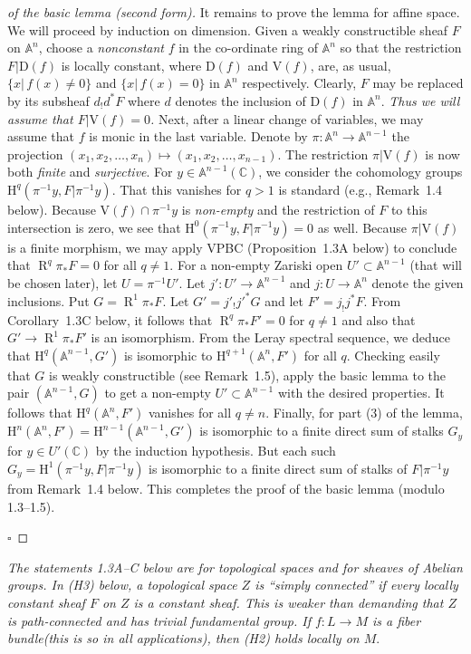 \documentclass[10pt,twoside]{article}
\newcommand{\homology}{{\mathrm {H}}}
\newcommand{\C}{{\mathbb {C}}}
\newcommand{\V}{{\mathrm {V}}}
\newcommand{\A}{{\mathbb {A}}}
\newcommand{\derived}{{\operatorname{R}}}
\newcommand{\qed}{\nopagebreak\par\hspace*{\fill}$\square$\par\vskip2mm}
\newtheorem{proof}{Proof}
\begin{document}
\begin{proof}[of the basic lemma (second form)]
  It remains to prove the lemma for affine space.
We will proceed
by induction on dimension. Given a weakly constructible sheaf $F$
on $\A^n$, choose a \emph{nonconstant} $f$ in the co-ordinate
ring of $\A^n$ so that the restriction $F|\mathrm{D}(f)$ is
locally constant, where $\mathrm{D}(f)$ and $\V(f)$, are, as usual,
$\{ x|\,f(x)\neq 0\}$ and $\{x|\,f(x)=0\}$ in $\A^n$
respectively. 
Clearly, $F$ may be replaced by its subsheaf $d_!d^*F$ where
$d$ denotes the inclusion of $\mathrm{D}(f)$ in $\A^n$.
\emph{Thus we will assume that $F|\V(f)=0$.} 
Next,
after a linear change of variables, we may assume that $f$
is monic in the last variable. 
Denote by $\pi : \A^n \to
\A^{n-1}$ the projection $(x_1,x_2,\ldots ,x_n)\mapsto 
(x_1,x_2,\ldots, x_{n-1})$. The restriction $\pi |\V(f)$ is now
both \emph{finite} and \emph{surjective}. For $y\in \A^{n-1}(\C)$,
we consider the cohomology groups $\homology ^q
(\pi^{-1}y,F|\pi^{-1}y)$. That this vanishes for $q>1$  
is standard (e.g., Remark~1.4 below). 
Because $\V(f)\cap \pi^{-1}y$ is \emph{non-empty} and the restriction of
$F$ to this intersection is zero, we see that 
$\homology^0(\pi^{-1}y ,F|\pi^{-1}y)=0$ as well. 
Because $\pi |\V(f)$
is a finite morphism, we may apply VPBC (Proposition~1.3A below)
  to conclude that $\derived^q\pi_*F=0$
for all $q\neq 1$.  
For a non-empty Zariski open $U'\subset \A^{n-1}$ (that will be chosen
later),
let $U=\pi^{-1}U'$.
Let $j':U'\to \A^{n-1}$ and $j:U\to \A^n$ denote the given inclusions.
Put $G=\derived^1\pi_*F$. Let $G'=j'_!{j'}^*G$ and let $F'=j_!j^*F$.
From Corollary~1.3C below, it follows that 
$ \derived^q\pi_*F'=0$ for $q\neq 1$ and also that 
$G'\to \derived^1\pi_*F'$ is an isomorphism.
 From the  
Leray spectral sequence, we deduce that 
$\homology^q(\A^{n-1},G')$ is isomorphic to
$\homology^{q+1}(\A^n, F')$ for all $q$.
Checking easily that $G$ is weakly constructible 
(see Remark~1.5), 
apply the basic lemma to the pair  $(\A^{n-1}, G)$ to get a non-empty 
$U'\subset \A^{n-1}$ with the desired properties. It follows that 
$\homology^q(\A^n, F')$ vanishes for all $q\neq n$.
Finally, for part (3) of the lemma, 
$\homology^n(\A^n, F')=\homology^{n-1}(\A^{n-1},G')$
is isomorphic to a finite direct sum of stalks $G_y$ 
for $y\in U'(\C)$ by the induction hypothesis. But each such 
$G_y=\homology ^1(\pi^{-1}y,F|\pi^{-1}y)$ is
 isomorphic to a finite direct sum of stalks of $F|\pi^{-1}y$
from Remark~1.4 below.
This completes the proof of the basic lemma (modulo 1.3--1.5).
\qed\end{proof}

\emph{The statements 1.3A--C below are for topological
spaces and for sheaves of Abelian groups. In (H3) below, a 
topological space $Z$ is ``simply connected'' if every
locally constant sheaf $F$ on $Z$ is a constant sheaf. This is weaker
 than 
demanding that $Z$ is path-connected and has trivial fundamental group. 
If $f:L \to M$ is
 a fiber bundle(this is so in all applications), then (H2) holds locally on 
$M$}.
\end{document}
